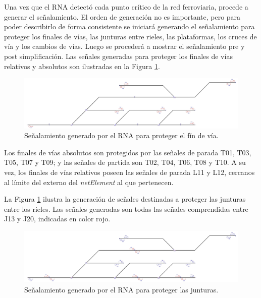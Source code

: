 	Una vez que el RNA detectó cada punto crítico de la red ferroviaria, procede a generar el señalamiento. El orden de generación no es importante, pero para poder describirlo de forma consistente se iniciará generando el señalamiento para proteger los finales de vías, las junturas entre rieles, las plataformas, los cruces de vía y los cambios de vías. Luego se procederá a mostrar el señalamiento pre y post simplificación. Las señales generadas para proteger los finales de vías relativos y absolutos son ilustradas en la Figura \ref{fig:EJ6_3}.

	\begin{figure}[H]
		\centering
		\includegraphics[width=1\textwidth]{resultados-obtenidos/ejemplo6/images/6_step1.png}
		\centering\caption{Señalamiento generado por el RNA para proteger el fín de vía.}
		\label{fig:EJ6_3}
	\end{figure}

	Los finales de vías absolutos son protegidos por las señales de parada T01, T03, T05, T07 y T09; y las señales de partida son T02, T04, T06, T08 y T10. A su vez, los finales de vías relativos poseen las señales de parada L11 y L12, cercanos al límite del externo del \textit{netElement} al que pertenecen.
	
	La Figura \ref{fig:EJ6_3} ilustra la generación de señales destinadas a proteger las junturas entre los rieles. Las señales generadas son todas las señales comprendidas entre J13 y J20, indicadas en color rojo.

	\begin{figure}[H]
		\centering
		\includegraphics[width=1\textwidth]{resultados-obtenidos/ejemplo6/images/6_step2.png}
		\centering\caption{Señalamiento generado por el RNA para proteger las junturas.}
		\label{fig:EJ6_4}
	\end{figure}
	
